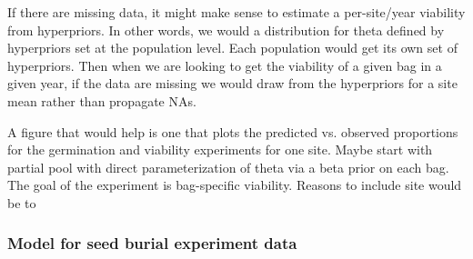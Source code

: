 \documentclass[12pt, oneside, titlepage]{article}   	%
\begin{document}
If there are missing data, it might make sense to estimate a per-site/year viability from hyperpriors. In other words, we would a distribution for theta defined by hyperpriors set at the population level. Each population would get its own set of hyperpriors. Then when we are looking to get the viability of a given bag in a given year, if the data are missing we would draw from the hyperpriors for a site mean rather than propagate NAs. 

A figure that would help is one that plots the predicted vs. observed proportions for the germination and viability experiments for one site. 
 Maybe start with partial pool with direct parameterization of theta via a beta prior on each bag. The goal of the experiment is bag-specific viability. Reasons to include site would be to



\subsubsection*{Model for seed burial experiment data}
\end{document}

